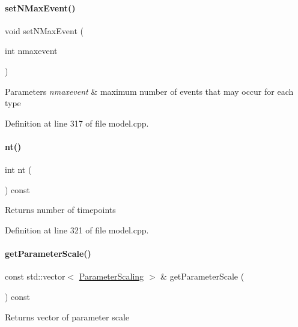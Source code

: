 \paragraph{\texorpdfstring{setNMaxEvent()}{setNMaxEvent()}}
{\footnotesize\ttfamily void set\+N\+Max\+Event (\begin{DoxyParamCaption}\item[{int}]{nmaxevent }\end{DoxyParamCaption})}


\begin{DoxyParams}{Parameters}
{\em nmaxevent} & maximum number of events that may occur for each type \\
\hline
\end{DoxyParams}


Definition at line 317 of file model.\+cpp.

\mbox{\label{classamici_1_1_model_a4c23d300cbe15b0afb1ee3731d47cc93}} 
\paragraph{\texorpdfstring{nt()}{nt()}}
{\footnotesize\ttfamily int nt (\begin{DoxyParamCaption}{ }\end{DoxyParamCaption}) const}

\begin{DoxyReturn}{Returns}
number of timepoints 
\end{DoxyReturn}


Definition at line 321 of file model.\+cpp.

\mbox{\label{classamici_1_1_model_ab14620b22a79748a09a88b9311a7f6d5}} 
\paragraph{\texorpdfstring{getParameterScale()}{getParameterScale()}}
{\footnotesize\ttfamily const std\+::vector$<$ \mbox{\hyperlink{namespaceamici_a42f062082226e9284c201d9eab71a3a0}{Parameter\+Scaling}} $>$ \& get\+Parameter\+Scale (\begin{DoxyParamCaption}{ }\end{DoxyParamCaption}) const}

\begin{DoxyReturn}{Returns}
vector of parameter scale 
\end{DoxyReturn}


